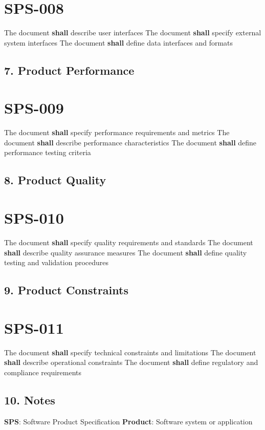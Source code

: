 \section{SPS-008}\label{SPS-008}

The document \textbf{shall} describe user interfaces
The document \textbf{shall} specify external system interfaces
The document \textbf{shall} define data interfaces and formats

\subsection{7. Product Performance}

\section{SPS-009}\label{SPS-009}

The document \textbf{shall} specify performance requirements and metrics
The document \textbf{shall} describe performance characteristics
The document \textbf{shall} define performance testing criteria

\subsection{8. Product Quality}

\section{SPS-010}\label{SPS-010}

The document \textbf{shall} specify quality requirements and standards
The document \textbf{shall} describe quality assurance measures
The document \textbf{shall} define quality testing and validation procedures

\subsection{9. Product Constraints}

\section{SPS-011}\label{SPS-011}

The document \textbf{shall} specify technical constraints and limitations
The document \textbf{shall} describe operational constraints
The document \textbf{shall} define regulatory and compliance requirements

\subsection{10. Notes}
\textbf{SPS}: Software Product Specification
\textbf{Product}: Software system or application


